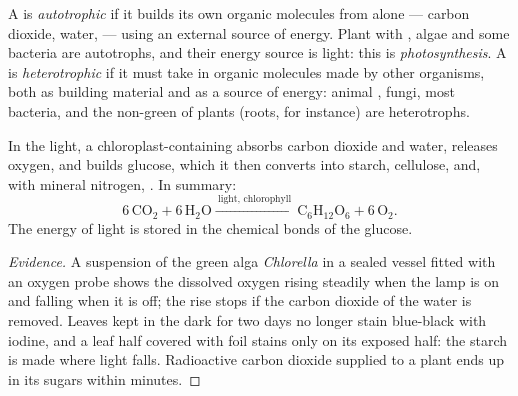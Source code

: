 \begin{definition}\label{def:g10:cell-metabolism:autotrophy}
A  is \emph{autotrophic} if it builds its own
organic molecules from  alone --- carbon dioxide, water,
 --- using an external source of energy. Plant  with
, algae and some bacteria are autotrophs, and their energy
source is light: this is \emph{photosynthesis}.
A  is \emph{heterotrophic} if it must take in
organic molecules made by other organisms, both as building material
and as a source of energy: animal , fungi, most bacteria, and the
non-green  of plants (roots, for instance) are heterotrophs.
\end{definition}

\begin{proposition}[Photosynthesis]\label{prop:g10:cell-metabolism:photosynthesis}
In the light, a chloroplast-containing  absorbs carbon dioxide and
water, releases oxygen, and builds glucose, which it then converts into
starch, cellulose,  and, with mineral nitrogen, . In
summary:
\[
6\,\mathrm{CO_2} + 6\,\mathrm{H_2O} \xrightarrow{\ \text{light, chlorophyll}\ }
\mathrm{C_6H_{12}O_6} + 6\,\mathrm{O_2}.
\]
The energy of light is stored in the chemical bonds of the glucose.
\end{proposition}
\begin{proof}[Evidence]
A suspension of the green alga \emph{Chlorella} in a sealed vessel
fitted with an oxygen probe shows the dissolved oxygen rising steadily
when the lamp is on and falling when it is off; the rise stops if the
carbon dioxide of the water is removed. Leaves kept in the dark for two
days no longer stain blue-black with iodine, and a leaf half covered
with foil stains only on its exposed half: the starch is made where
light falls. Radioactive carbon dioxide supplied to a plant ends up in
its sugars within minutes.
\end{proof}

